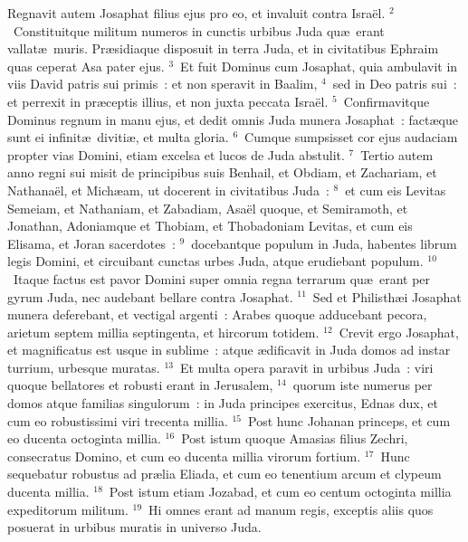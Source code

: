 \bchapter
\lettrine[lines=3,image=true,loversize=0.05,lraise=-0.03]{R}{}egnavit autem Josaphat filius ejus pro eo, et invaluit contra Isra\"el.
${}^{2}$~Constituitque militum numeros in cunctis urbibus Juda qu\ae\ erant vallat\ae\ muris. Pr\ae sidiaque disposuit in terra Juda, et in civitatibus Ephraim quas ceperat Asa pater ejus.
${}^{3}$~Et fuit Dominus cum Josaphat, quia ambulavit in viis David patris sui primis~: et non speravit in Baalim,
${}^{4}$~sed in Deo patris sui~: et perrexit in pr\ae ceptis illius, et non juxta peccata Isra\"el.
${}^{5}$~Confirmavitque Dominus regnum in manu ejus, et dedit omnis Juda munera Josaphat~: fact\ae que sunt ei infinit\ae\ diviti\ae , et multa gloria.
${}^{6}$~Cumque sumpsisset cor ejus audaciam propter vias Domini, etiam excelsa et lucos de Juda abstulit.
${}^{7}$~Tertio autem anno regni sui misit de principibus suis Benhail, et Obdiam, et Zachariam, et Nathana\"el, et Mich\ae am, ut docerent in civitatibus Juda~:
${}^{8}$~et cum eis Levitas Semeiam, et Nathaniam, et Zabadiam, Asa\"el quoque, et Semiramoth, et Jonathan, Adoniamque et Thobiam, et Thobadoniam Levitas, et cum eis Elisama, et Joran sacerdotes~:
${}^{9}$~docebantque populum in Juda, habentes librum legis Domini, et circuibant cunctas urbes Juda, atque erudiebant populum.
${}^{10}$~Itaque factus est pavor Domini super omnia regna terrarum qu\ae\ erant per gyrum Juda, nec audebant bellare contra Josaphat.
${}^{11}$~Sed et Philisth\ae i Josaphat munera deferebant, et vectigal argenti~: Arabes quoque adducebant pecora, arietum septem millia septingenta, et hircorum totidem.
${}^{12}$~Crevit ergo Josaphat, et magnificatus est usque in sublime~: atque \ae dificavit in Juda domos ad instar turrium, urbesque muratas.
${}^{13}$~Et multa opera paravit in urbibus Juda~: viri quoque bellatores et robusti erant in Jerusalem,
${}^{14}$~quorum iste numerus per domos atque familias singulorum~: in Juda principes exercitus, Ednas dux, et cum eo robustissimi viri trecenta millia.
${}^{15}$~Post hunc Johanan princeps, et cum eo ducenta octoginta millia.
${}^{16}$~Post istum quoque Amasias filius Zechri, consecratus Domino, et cum eo ducenta millia virorum fortium.
${}^{17}$~Hunc sequebatur robustus ad pr\ae lia Eliada, et cum eo tenentium arcum et clypeum ducenta millia.
${}^{18}$~Post istum etiam Jozabad, et cum eo centum octoginta millia expeditorum militum.
${}^{19}$~Hi omnes erant ad manum regis, exceptis aliis quos posuerat in urbibus muratis in universo Juda.

